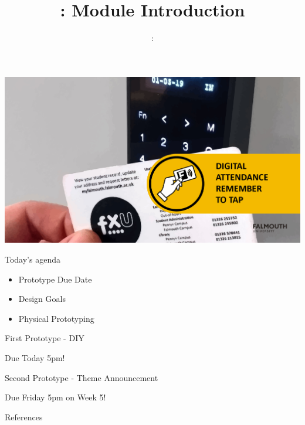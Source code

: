 \usepackage{../../beamerthemeFalmouthGamesAcademy}
\usepackage{multimedia}
\graphicspath{ {../../} }


\usepackage[normalem]{ulem}
\usepackage{wasysym}
\usepackage{graphicx} %

\usepackage{pdfpages}

\usetikzlibrary{arrows,automata}





\title{\sessionnumber: Module Introduction}
\subtitle{\modulecode: \moduletitle}

\begin{frame}
	\includegraphics[width=1.0\textwidth]{sign-in}
\end{frame}

\frame{\titlepage} 


\begin{frame}{Today's agenda}
	\begin{itemize}
		\item Prototype Due Date
		\item Design Goals
		\item Physical Prototyping
	\end{itemize}
\end{frame}

\begin{frame}{First Prototype - DIY}
\begin{center}
	\Huge{Due Today 5pm!}
\end{center}
\end{frame}




\begin{frame}{Second Prototype - Theme Announcement}
\begin{center}
	\Huge{Due Friday 5pm on Week 5!}
\end{center}
\end{frame}

\begin{frame}{References}
\end{frame}


